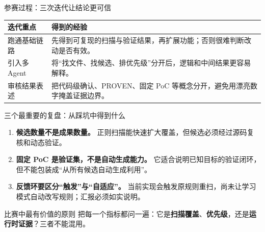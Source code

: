 \documentclass[10pt,aspectratio=169]{beamer}
\newcommand{\key}[1]{\textcolor{accentblue}{\textbf{#1}}}
\begin{document}
\begin{frame}{参赛过程：三次迭代让结论更可信}
  \centering

  \vspace{0.9em}
  \begin{tabular}{p{3cm}p{8.3cm}}
    \toprule
    \textbf{迭代重点} & \textbf{得到的经验} \\
    \midrule
    跑通基础链路 & 先得到可复现的扫描与验证结果，再扩展功能；否则很难判断改动是否有效。 \\
    引入多 Agent & 将“找文件、找候选、排优先级”分开后，逻辑和中间结果更容易解释。 \\
    审核结果表述 & 把代码级确认、PROVEN、固定 PoC 等概念分开，避免用漂亮数字掩盖证据边界。 \\
    \bottomrule
  \end{tabular}
\end{frame}

\begin{frame}{三个最重要的复盘：从踩坑中得到什么}
  \begin{enumerate}
    \item \textbf{候选数量不是成果数量。} 正则扫描能快速扩大覆盖，但候选必须经过源码复核和动态验证。
    \vspace{0.5em}
    \item \textbf{固定 PoC 是验证集，不是自动生成能力。} 它适合说明已知目标的验证闭环，但不能包装成“从所有候选自动生成利用”。
    \vspace{0.5em}
    \item \textbf{反馈环要区分“触发”与“自适应”。} 当前实现会触发原规则重扫，尚未让学习模式自动改写规则；汇报必须如实说明。
  \end{enumerate}

  \vspace{0.7em}
  \begin{exampleblock}{比赛中最有价值的原则}
    把每一个指标都问一遍：它是\key{扫描覆盖}、\key{优先级}，还是\key{运行时证据}？三者不能混用。
  \end{exampleblock}
\end{frame}
\end{document}
